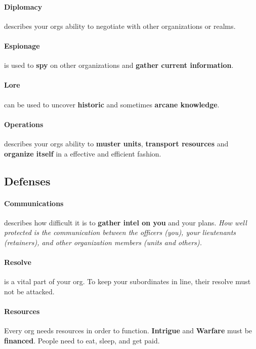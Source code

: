 \documentclass[letterpaper,twocolumn,openany,nodeprecatedcode]{dndbook}
\begin{document}
\paragraph{Diplomacy} describes your orgs ability to negotiate with other organizations or realms.

\paragraph{Espionage} is used to \textbf{spy} on other organizations and \textbf{gather current information}.

\paragraph{Lore} can be used to uncover \textbf{historic} and sometimes \textbf{arcane knowledge}.

\paragraph{Operations} describes your orgs ability to \textbf{muster units}, \textbf{transport resources} and \textbf{organize itself} in a effective and efficient fashion.

\subsection{Defenses}

\paragraph{Communications} describes how difficult it is to \textbf{gather intel on you} and your plans.
\textit{How well protected is the communication between the officers (you), your lieutenants (retainers), and other organization members (units and others).}

\paragraph{Resolve} is a vital part of your org. To keep your subordinates in line, their resolve must not be attacked.

\paragraph{Resources} Every org needs resources in order to function. \textbf{Intrigue} and \textbf{Warfare} must be \textbf{financed}. People need to eat, sleep, and get paid.
\end{document}
